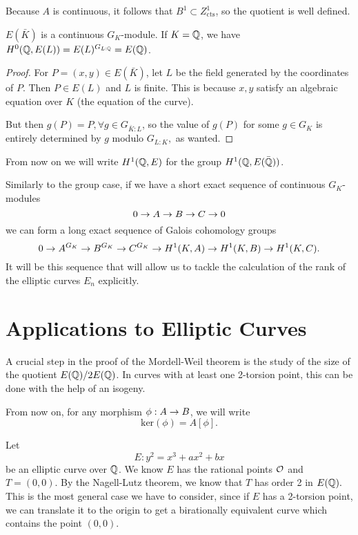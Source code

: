 \documentclass[12pt, a4paper]{report}
\begin{document}
\begin{remark}
  Because $A$ is continuous, it follows that $B^1 \subset Z^1_{\text{cts}}$, so
  the quotient is well defined.
\end{remark}

\begin{lemma}
  $E(\bar{K})$ is a continuous $G_K$-module.
  If $K = {\mathbb Q}$, we have $H^0({\mathbb Q},E(L)) = E(L)^{G_{L:{\mathbb Q}}} = E({\mathbb Q})$.
\end{lemma}
\begin{proof}
  For $P = (x,y) \in E(\bar{K})$, let $L$ be the field generated
  by the coordinates of $P$. Then $P \in E(L)$ and $L$ is finite. This is
  because $x, y$ satisfy an algebraic equation over $K$ (the equation of the curve).

  But then $g (P) = P, \forall g \in G_{\bar{K} : L}$, so the value of $g(P)$
  for some $g \in G_K$ is entirely determined by $g$ modulo $G_{L:K},$ as wanted.
\end{proof}
  
\begin{remark}
  From now on we will write $H^1({\mathbb Q}, E)$ for the group $H^1({\mathbb Q}, E(\bar{{\mathbb Q}}))$.
\end{remark}

Similarly to the group case, if we have a short exact sequence of continuous $G_K$-modules
\[ 0 \rightarrow A \rightarrow B \rightarrow C \rightarrow 0\]
we can form a long exact sequence of Galois cohomology groups
\[0 \rightarrow A^{G_K} \rightarrow B^{G_K} \rightarrow C^{G_K} \rightarrow H^1(K,A) \rightarrow H^1(K,B) \rightarrow H^1(K,C).\]
It will be this sequence that will allow us to tackle the calculation of the
rank of the elliptic curves $E_n$ explicitly.

\section{Applications to Elliptic Curves} \label{sec:applications}
A crucial step in the proof of the Mordell-Weil theorem is the study of the size
of the quotient $E({\mathbb Q}) / 2 E({\mathbb Q})$. In curves with at least one 2-torsion
point, this can be done with the help of an isogeny.

\begin{remark}
  From now on, for any morphism $\phi : A \rightarrow B$, we
  will write $$\text{ker}(\phi) = A[\phi].$$
\end{remark}

Let $$E : y^2 = x^3 + ax^2 + bx$$ be an elliptic curve over ${\mathbb Q}$. We know $E$
has the rational points ${\mathcal O}$ and $ T = (0,0)$. By the Nagell-Lutz theorem, we
know that $T$ has order 2 in $E({\mathbb Q}).$ This is the most general case we have to
consider, since if $E$ has a 2-torsion point, we can translate it to the origin
to get a birationally equivalent curve which contains the point $(0,0).$
\end{document}
